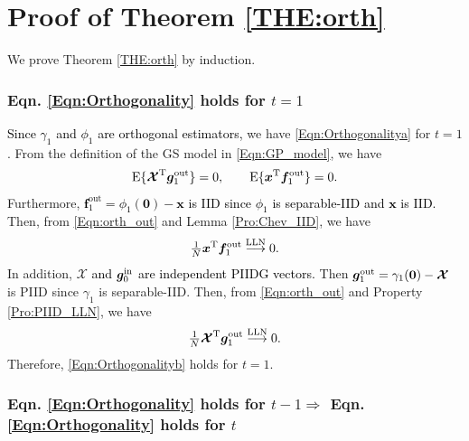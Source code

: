 \documentclass[journal]{IEEEtran}
\newcommand{\mr}{\mathrm}
\newcommand{\BE}{\begin{equation}}
\newcommand{\EE}{\end{equation}}
\renewcommand{\bf}{\bm}
\newcommand{\LL}[1]{\textcolor{black}{#1}}
\newcommand{\LLC}[1]{\textcolor{black}{#1}}%
\begin{document}
\section{Proof of Theorem \ref{THE:orth}}\label{APP:orth}
We  prove Theorem \ref{THE:orth} by induction.

 \subsubsection{Eqn. \texorpdfstring{\eqref{Eqn:Orthogonality}}{TEXT} holds for \texorpdfstring{$t=1$}{TEXT}}  
 
     \LL{Since $\gamma_{1}$ and $\phi_{1}$ are orthogonal estimators,} we have \eqref{Eqn:Orthogonalitya} for $t=1$. From the definition of the GS model in \eqref{Eqn:GP_model}, we have 
    \begin{align}\label{Eqn:orth_out}
        {\rm E}\{\bf{\mathcal{X}}^{\rm T}\bf{g}_1^{\rm out}\} =0, \qquad
        {\rm E}\{\bf{x}^{\rm T}\bf{f}_1^{\rm out}\}=0. 
    \end{align} 
    Furthermore, \LLC{$\bf{f}^{\mr{out}}_{1} =\phi_1(\bf{0})-\bf{x}$ is IID since  $\phi_1$ is separable-IID and $\bf{x}$ is IID.} Then, from \eqref{Eqn:orth_out} and Lemma \ref{Pro:Chev_IID}, we have
    \BE
       \tfrac{1}{N}\bf{x}^{\rm T} \bf{f}^{\mr{out}}_{1}  \overset{\rm LLN}{\longrightarrow}  {0}.
    \EE
   In addition, \LLC{$\bf{\mathcal{X}}$ and $\bf{g}_0^{\rm in}$ are independent PIIDG vectors.} Then $\bf{g}_1^{\rm out} = \gamma_1(\bf{0})-\bf{\mathcal{X}}$ is PIID since $\gamma_1$ is separable-IID. Then, from  \eqref{Eqn:orth_out} and Property \ref{Pro:PIID_LLN}, we have
    \BE
        \tfrac{1}{N}\bf{\mathcal{X}}^{\rm T}\bf{g}_1^{\rm out}    
        \overset{\rm LLN}{\longrightarrow}  {0}.
    \EE 
  Therefore, \eqref{Eqn:Orthogonalityb} holds for $t=1$.  
   
    
 \subsubsection{Eqn. \texorpdfstring{\eqref{Eqn:Orthogonality}}{TEXT} holds for \texorpdfstring{$t-1\Rightarrow$}{TEXT} Eqn. \texorpdfstring{\eqref{Eqn:Orthogonality}}{TEXT} holds for \texorpdfstring{$t$}{TEXT}}
       
\end{document}
